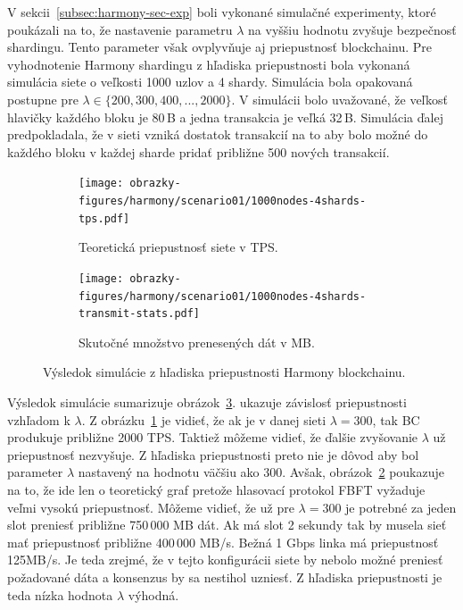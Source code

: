V sekcii~\ref{subsec:harmony-sec-exp} boli vykonané simulačné experimenty, ktoré poukázali na to, že nastavenie parametru $\lambda$ na vyššiu hodnotu zvyšuje bezpečnosť shardingu. Tento parameter však ovplyvňuje aj priepustnosť blockchainu. Pre vyhodnotenie Harmony shardingu z hľadiska priepustnosti bola vykonaná simulácia siete o veľkosti 1000 uzlov a 4 shardy. Simulácia bola opakovaná postupne pre $\lambda \in \{200, 300, 400, ..., 2000\}$. V simulácii bolo uvažované, že veľkosť hlavičky každého bloku je 80\,B a jedna transakcia je veľká 32\,B. Simulácia ďalej predpokladala, že v sieti vzniká dostatok transakcií na to aby bolo možné do každého bloku v každej sharde pridať približne 500 nových transakcií.

\begin{figure}[H]
	\centering
	\begin{subfigure}{.5\textwidth}
		\centering
		\texttt{[image: obrazky-figures/harmony/scenario01/1000nodes-4shards-tps.pdf]}
		\caption{Teoretická priepustnosť siete v TPS.}
		\label{img:harmony-scenario01-a}
	\end{subfigure}%
	\begin{subfigure}{.5\textwidth}
		\centering
		\texttt{[image: obrazky-figures/harmony/scenario01/1000nodes-4shards-transmit-stats.pdf]}
		\caption{Skutočné množstvo prenesených dát v MB.}
		\label{img:harmony-scenario01-b}
	\end{subfigure}%
	\caption{Výsledok simulácie z hľadiska priepustnosti Harmony blockchainu.}
	\label{img:harmony-perform-exp}
\end{figure}

Výsledok simulácie sumarizuje obrázok~\ref{img:harmony-perform-exp}. ukazuje závislosť priepustnosti vzhľadom k $\lambda$. Z obrázku~\ref{img:harmony-scenario01-a} je vidieť, že ak je v danej sieti $\lambda = 300$, tak BC produkuje približne 2000 TPS. Taktiež môžeme vidieť, že ďalšie zvyšovanie $\lambda$ už priepustnosť nezvyšuje. Z hľadiska priepustnosti preto nie je dôvod aby bol parameter $\lambda$ nastavený na hodnotu väčšiu ako 300. Avšak, obrázok~\ref{img:harmony-scenario01-b} poukazuje na to, že ide len o teoretický graf pretože hlasovací protokol FBFT vyžaduje veľmi vysokú priepustnosť. Môžeme vidieť, že už pre $\lambda = 300$ je potrebné za jeden slot preniesť približne 750\,000 MB dát. Ak má slot 2 sekundy tak by musela sieť mať priepustnosť približne 400\,000 MB/s. Bežná 1 Gbps linka má priepustnosť 125MB/s. Je teda zrejmé, že v tejto konfigurácii siete by nebolo možné preniesť požadované dáta a konsenzus by sa nestihol uzniesť. Z hľadiska priepustnosti je teda nízka hodnota $\lambda$ výhodná.


